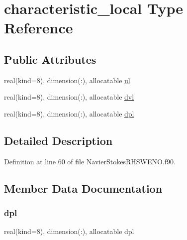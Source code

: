 \hypertarget{structnavierstokesrhsweno_1_1characteristic__local}{}\section{characteristic\+\_\+local Type Reference}
\label{structnavierstokesrhsweno_1_1characteristic__local}
\subsection*{Public Attributes}
\begin{DoxyCompactItemize}
\item 
real(kind=8), dimension(\+:), allocatable \hyperlink{structnavierstokesrhsweno_1_1characteristic__local_a5c06967f28c037eba665af6d7fa98c25}{ul}
\item 
real(kind=8), dimension(\+:), allocatable \hyperlink{structnavierstokesrhsweno_1_1characteristic__local_a5a45a3f309780c73848885e60e2397e4}{dvl}
\item 
real(kind=8), dimension(\+:), allocatable \hyperlink{structnavierstokesrhsweno_1_1characteristic__local_af7566974682b68e179156f89ce719e74}{dpl}
\end{DoxyCompactItemize}


\subsection{Detailed Description}


Definition at line 60 of file Navier\+Stokes\+R\+H\+S\+W\+E\+N\+O.\+f90.



\subsection{Member Data Documentation}
\hypertarget{structnavierstokesrhsweno_1_1characteristic__local_af7566974682b68e179156f89ce719e74}{}\label{structnavierstokesrhsweno_1_1characteristic__local_af7566974682b68e179156f89ce719e74} 
\subsubsection{\texorpdfstring{dpl}{dpl}}
{\footnotesize\ttfamily real(kind=8), dimension(\+:), allocatable dpl}




